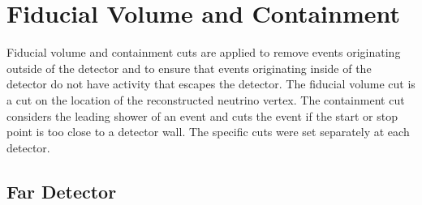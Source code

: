\section{Fiducial Volume and Containment}

Fiducial volume and containment cuts are applied to remove events originating outside of the detector and to ensure that events originating inside of the detector do not have activity that escapes the detector. The fiducial volume cut is a cut on the location of the reconstructed neutrino vertex. The containment cut considers the leading shower of an event and cuts the event if the start or stop point is too close to a detector wall. The specific cuts were set separately at each detector.

\subsection{Far Detector}

